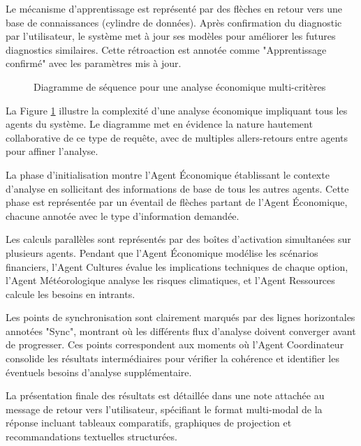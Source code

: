 Le mécanisme d'apprentissage est représenté par des flèches en retour vers une base de connaissances (cylindre de données). Après confirmation du diagnostic par l'utilisateur, le système met à jour ses modèles pour améliorer les futures diagnostics similaires. Cette rétroaction est annotée comme "Apprentissage confirmé" avec les paramètres mis à jour.

\begin{figure}[h]
\centering
\caption{Diagramme de séquence pour une analyse économique multi-critères}
\label{fig:sequence_economic}
\end{figure}

La Figure \ref{fig:sequence_economic} illustre la complexité d'une analyse économique impliquant tous les agents du système. Le diagramme met en évidence la nature hautement collaborative de ce type de requête, avec de multiples allers-retours entre agents pour affiner l'analyse.

La phase d'initialisation montre l'Agent Économique établissant le contexte d'analyse en sollicitant des informations de base de tous les autres agents. Cette phase est représentée par un éventail de flèches partant de l'Agent Économique, chacune annotée avec le type d'information demandée.

Les calculs parallèles sont représentés par des boîtes d'activation simultanées sur plusieurs agents. Pendant que l'Agent Économique modélise les scénarios financiers, l'Agent Cultures évalue les implications techniques de chaque option, l'Agent Météorologique analyse les risques climatiques, et l'Agent Ressources calcule les besoins en intrants.

Les points de synchronisation sont clairement marqués par des lignes horizontales annotées "Sync", montrant où les différents flux d'analyse doivent converger avant de progresser. Ces points correspondent aux moments où l'Agent Coordinateur consolide les résultats intermédiaires pour vérifier la cohérence et identifier les éventuels besoins d'analyse supplémentaire.

La présentation finale des résultats est détaillée dans une note attachée au message de retour vers l'utilisateur, spécifiant le format multi-modal de la réponse incluant tableaux comparatifs, graphiques de projection et recommandations textuelles structurées.
